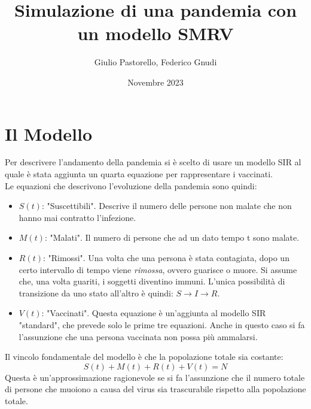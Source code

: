 \documentclass{article}
\title{Simulazione di una pandemia con un modello SMRV}
\author{Giulio Pastorello, Federico Gnudi}
\date{Novembre 2023}
\begin{document}
\maketitle

\section{Il Modello}

\hspace{\parindent} Per descrivere l'andamento della pandemia si è scelto 
di usare un modello SIR al quale è stata aggiunta un quarta 
equazione per rappresentare i vaccinati.\\
Le equazioni che descrivono l'evoluzione della pandemia sono quindi:
\begin{itemize}
\item $S(t)$: "Suscettibili". Descrive il numero delle persone non 
malate che non hanno mai contratto l'infezione.
\item $M(t)$: "Malati". Il numero di persone che ad un dato tempo 
t sono malate. 
\item $R(t)$: "Rimossi". Una volta che una persona è stata 
contagiata, dopo un certo intervallo di tempo viene \textit{rimossa}, 
ovvero guarisce o muore. Si assume che, una volta guariti, 
i soggetti diventino immuni. L'unica possibilità di transizione da 
uno stato all'altro è quindi: $S\xrightarrow{}I\xrightarrow{}R$.
\item $V(t)$: "Vaccinati". Questa equazione è un'aggiunta al modello 
SIR "standard", che prevede solo le prime tre equazioni. 
Anche in questo caso si fa l'assunzione che una persona vaccinata 
non possa più ammalarsi.
\end{itemize}
Il vincolo fondamentale del modello è che la popolazione totale 
sia costante:
\begin{equation}\label{eq::pop}
S(t)+M(t)+R(t)+V(t)=N
\end{equation}
Questa è un'approssimazione ragionevole se si fa l'assunzione 
che il numero totale di persone che muoiono a causa del virus 
sia trascurabile rispetto alla popolazione totale. 
\end{document}
